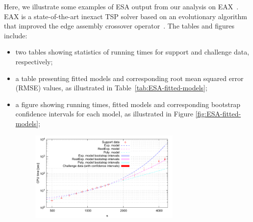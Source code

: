\documentclass[aic]{iosart2x}
\begin{document}
\label{sec:ESA-Output}

 Here, we illustrate some examples of ESA output from our analysis on EAX~\cite{NagKob13}. EAX is a state-of-the-art inexact TSP solver based on an evolutionary algorithm that improved the edge assembly crossover operator~\cite{Nag97}. The tables and figures include:
\begin{itemize}
\item two tables showing statistics of running times for support and challenge
data, respectively;
\item a table presenting fitted models and corresponding root mean squared error (RMSE) values, as illustrated
in Table~\ref{tab:ESA-fitted-models};
\begin{table}[t]
\caption{Fitted models example} \label{tab:ESA-fitted-models}
\begin{centering}
\medskip{}
\par
\end{centering}
\end{table}

\item a figure showing running times, fitted models and corresponding bootstrap
confidence intervals for each model, as illustrated in Figure \ref{fig:ESA-fitted-models};
\begin{figure}[t]
\noindent \begin{centering}
\includegraphics[width=0.7\textwidth]{EAX_fittedModels} \vspace{-5mm}


\end{centering}
\end{figure}
\end{itemize}
\end{document}
